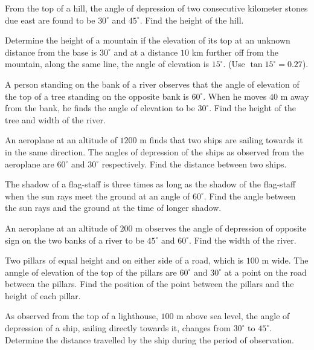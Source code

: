 \item From the top of a hill, the angle of depression of two consecutive kilometer stones due east are found to be $30^\circ$
  and $45^\circ$. Find the height of the hill.

\item Determine the height of a mountain if the elevation of its top at an unknown distance from the base is $30^\circ$ and at
  a distance $10$ km further off from the mountain, along the same line, the angle of elevation is $15^\circ.$ (Use
  $\tan 15^\circ = 0.27$).

\item A person standing on the bank of a river observes that the angle of elevation of the top of a tree standing on the opposite
  bank is $60^\circ$. When he moves $40$ m away from the bank, he finds the angle of elevation to be
  $30^\circ$. Find the height of the tree and width of the river.

\item An aeroplane at an altitude of $1200$ m finds that two ships are sailing towards it in the same direction. The angles of
  depression of the ships as observed from the aeroplane are $60^\circ$ and $30^\circ$ respectively. Find the
  distance between two ships.

\item The shadow of a flag-staff is three times as long as the shadow of the flag-staff when the sun rays meet the ground at an angle
  of $60^\circ$. Find the angle between the sun rays and the ground at the time of longer shadow.

\item An aeroplane at an altitude of $200$ m observes the angle of depression of opposite sign on the two banks of a river to
  be $45^\circ$ and $60^\circ$. Find the width of the river.

\item Two pillars of equal height and on either side of a road, which is $100$ m wide. The anngle of elevation of the top of
  the pillars are $60^\circ$ and $30^\circ$ at a point on the road between the pillars. Find the position of the
  point between the pillars and the height of each pillar.

\item As observed from the top of a lighthouse, $100$ m above sea level, the angle of depression of a ship, sailing directly
  towards it, changes from $30^\circ$ to $45^\circ$. Determine the distance travelled by the ship during the period
  of observation.

